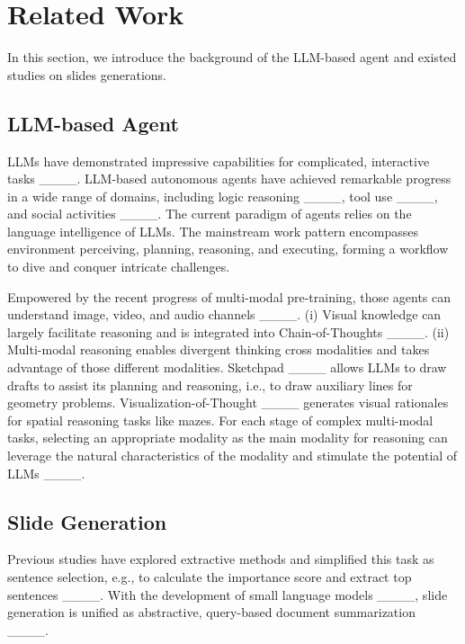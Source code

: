 \section{Related Work}
In this section, we introduce the background of the LLM-based agent and existed studies on slides generations.
\subsection{LLM-based Agent}
LLMs have demonstrated impressive capabilities for complicated, interactive tasks ____. LLM-based autonomous agents have achieved remarkable progress in a wide range of domains, including logic reasoning ____, tool use ____, and social activities ____. 
The current paradigm of agents relies on the language intelligence of LLMs.
The mainstream work pattern encompasses environment perceiving, planning, reasoning, and executing, forming a workflow to dive and conquer intricate challenges.

Empowered by the recent progress of multi-modal pre-training, those agents can understand image, video, and audio channels ____.
(i) Visual knowledge can largely facilitate reasoning and is integrated into Chain-of-Thoughts  ____. 
(ii) Multi-modal reasoning enables divergent thinking cross modalities and takes advantage of those different modalities. 
Sketchpad ____ allows LLMs to draw drafts to assist its planning and reasoning, i.e., to draw auxiliary lines for geometry problems.
Visualization-of-Thought ____ generates visual rationales for spatial reasoning tasks like mazes.
For each stage of complex multi-modal tasks, selecting an appropriate modality as the main modality for reasoning can leverage the natural characteristics of the modality and stimulate the potential of LLMs ____.

\subsection{Slide Generation} 
Previous studies have explored extractive methods and simplified this task as sentence selection, e.g., to calculate the importance score and extract top sentences ____. With the development of small language models ____, slide generation is unified as abstractive, query-based document summarization ____. 

